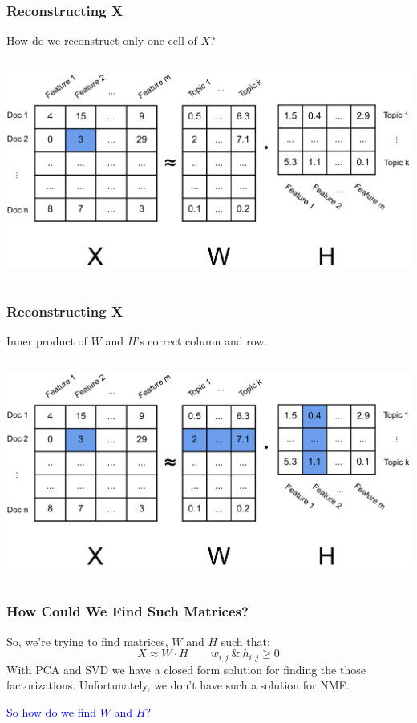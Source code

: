 \documentclass{beamer}
\begin{document}
\begin{frame}
  \frametitle{Reconstructing X}
  How do we reconstruct only one cell of $X$? \vspace{4mm}
  \begin{columns}
    \includegraphics[width=\textwidth]{images/x_w_h_cell.png}
  \end{columns} \vspace{4mm}
\end{frame}

\begin{frame}
  \frametitle{Reconstructing X}
  Inner product of $W$ and $H$'s correct column and row. \vspace{4mm}
  \begin{columns}
    \includegraphics[width=\textwidth]{images/x_w_h_reconstruction.png}
  \end{columns} \vspace{4mm}
\end{frame}

\begin{frame}
  \frametitle{How Could We Find Such Matrices?}
  So, we're trying to find matrices, $W$ and $H$ such that:
  $$ X \approx W \cdot H  \qquad w_{i, j}\: \& \: h_{i, j} \geq 0 $$
  With PCA and SVD we have a closed form solution for finding the those factorizations. Unfortunately, we don't have such a solution for NMF. \vspace{6mm} \pause

  \centering
  \textcolor{blue}{So how do we find $W$ and $H$?}
\end{frame}
\end{document}
